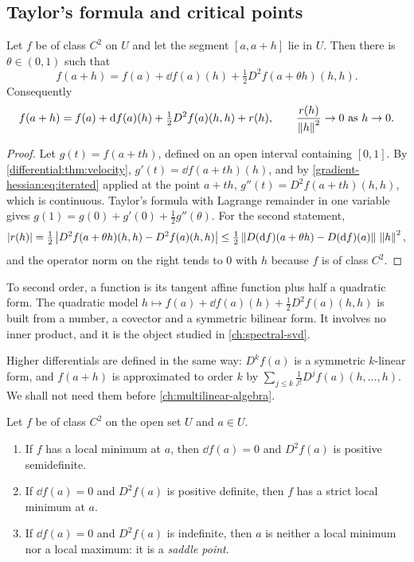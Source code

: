 \begin{notechapter}
\section{Taylor's formula and critical points}
\label{gradient-hessian:sec:taylor}

\begin{theorem}
\label{gradient-hessian:thm:taylor}
Let $f$ be of class $C^2$ on $U$ and let the segment $[a, a + h]$ lie in
$U$. Then there is $\theta\in(0, 1)$ such that
\[
  f(a + h) = f(a) + \dd f(a)(h) + \tfrac12D^2f(a + \theta h)(h, h) .
\]
Consequently
\[
  f(a + h) = f(a) + \mathrm{d} f(a)(h) + \tfrac12D^2f(a)(h, h) + r(h),
  \qquad \frac{r(h)}{\left\|h\right\|^2}\to0 \text{ as } h\to0 .
\]
\end{theorem}

\begin{proof}
Let $g(t) = f(a + th)$, defined on an open interval containing $[0, 1]$.
By \cref{differential:thm:velocity}, $g'(t) = \dd f(a + th)(h)$, and by
\eqref{gradient-hessian:eq:iterated} applied at the point $a + th$,
$g''(t) = D^2f(a + th)(h, h)$, which is continuous. Taylor's formula with
Lagrange remainder in one variable gives
$g(1) = g(0) + g'(0) + \frac12g''(\theta)$. For the second statement,
\[
  \left|r(h)\right|
  = \tfrac12\left|D^2f(a + \theta h)(h, h) - D^2f(a)(h, h)\right|
  \leq\tfrac12\left\|D(\mathrm{d} f)(a + \theta h) - D(\mathrm{d} f)(a)\right\|\,\left\|h\right\|^2 ,
\]
and the operator norm on the right tends to $0$ with $h$ because $f$ is of
class $C^2$.
\end{proof}

\begin{intuition}
To second order, a function is its tangent affine function plus half a
quadratic form. The quadratic model
$h\mapsto f(a) + \dd f(a)(h) + \frac12D^2f(a)(h, h)$ is built from a
number, a covector and a symmetric bilinear form. It involves no inner
product, and it is the object studied in \cref{ch:spectral-svd}.
\end{intuition}

Higher differentials are defined in the same way: $D^kf(a)$ is a
symmetric $k$-linear form, and $f(a + h)$ is approximated to order $k$ by
$\sum_{j\leq k}\frac1{j!}D^jf(a)(h,\dots,h)$. We shall not need them
before \cref{ch:multilinear-algebra}.

\begin{theorem}
\label{gradient-hessian:thm:second-order}
Let $f$ be of class $C^2$ on the open set $U$ and $a\in U$.
\begin{enumerate}[nosep]
  \item If $f$ has a local minimum at $a$, then $\dd f(a) = 0$ and
        $D^2f(a)$ is positive semidefinite.
  \item If $\dd f(a) = 0$ and $D^2f(a)$ is positive definite, then $f$ has
        a strict local minimum at $a$.
  \item If $\dd f(a) = 0$ and $D^2f(a)$ is indefinite, then $a$ is neither
        a local minimum nor a local maximum: it is a \emph{saddle point}.
\end{enumerate}
\end{theorem}


\end{notechapter}

